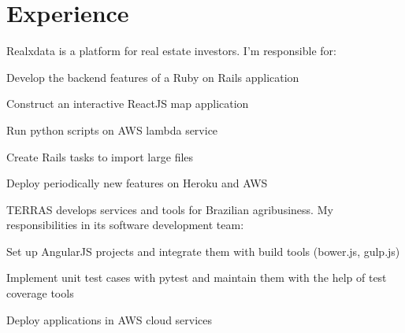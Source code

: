 \documentclass[]{joaosoares-resume}
\begin{document}
\begin{minipage}[t]{0.60\textwidth}

\section{Experience}
{\justifying Realxdata is a platform for real estate investors. I'm responsible for:\par}
\sectionsep
\begin{tightemize}
\item Develop the backend features of a Ruby on Rails application
\item Construct an interactive ReactJS map application
\item Run python scripts on AWS lambda service
\item Create Rails tasks to import large files
\item Deploy periodically new features on Heroku and AWS
\end{tightemize}

\sectionsep

{\justifying TERRAS develops services and tools for Brazilian agribusiness. My responsibilities in its software development team:\par}
\begin{tightemize}
\item Set up AngularJS projects and integrate them with build tools (bower.js, gulp.js)
\item Implement unit test cases with pytest and maintain them with the help of test coverage tools
\item Deploy applications in AWS cloud services
\end{tightemize}


\end{minipage}
\end{document}
